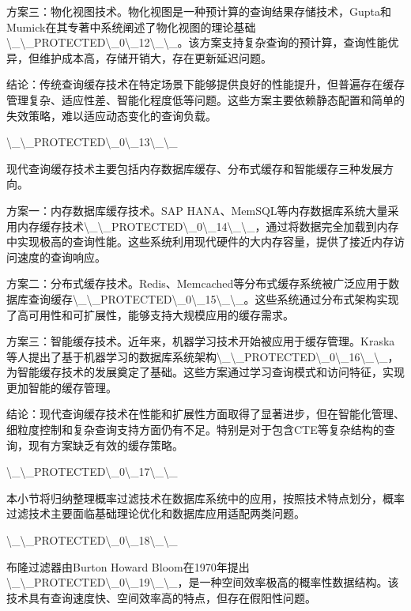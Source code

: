 方案三：物化视图技术。物化视图是一种预计算的查询结果存储技术，Gupta和Mumick在其专著中系统阐述了物化视图的理论基础\textbackslash{}_\textbackslash{}_PROTECTED\textbackslash{}_0\textbackslash{}_12\textbackslash{}_\textbackslash{}_。该方案支持复杂查询的预计算，查询性能优异，但维护成本高，存储开销大，存在更新延迟问题。

结论：传统查询缓存技术在特定场景下能够提供良好的性能提升，但普遍存在缓存管理复杂、适应性差、智能化程度低等问题。这些方案主要依赖静态配置和简单的失效策略，难以适应动态变化的查询负载。

\textbackslash{}_\textbackslash{}_PROTECTED\textbackslash{}_0\textbackslash{}_13\textbackslash{}_\textbackslash{}_

现代查询缓存技术主要包括内存数据库缓存、分布式缓存和智能缓存三种发展方向。

方案一：内存数据库缓存技术。SAP HANA、MemSQL等内存数据库系统大量采用内存缓存技术\textbackslash{}_\textbackslash{}_PROTECTED\textbackslash{}_0\textbackslash{}_14\textbackslash{}_\textbackslash{}_，通过将数据完全加载到内存中实现极高的查询性能。这些系统利用现代硬件的大内存容量，提供了接近内存访问速度的查询响应。

方案二：分布式缓存技术。Redis、Memcached等分布式缓存系统被广泛应用于数据库查询缓存\textbackslash{}_\textbackslash{}_PROTECTED\textbackslash{}_0\textbackslash{}_15\textbackslash{}_\textbackslash{}_。这些系统通过分布式架构实现了高可用性和可扩展性，能够支持大规模应用的缓存需求。

方案三：智能缓存技术。近年来，机器学习技术开始被应用于缓存管理。Kraska等人提出了基于机器学习的数据库系统架构\textbackslash{}_\textbackslash{}_PROTECTED\textbackslash{}_0\textbackslash{}_16\textbackslash{}_\textbackslash{}_，为智能缓存技术的发展奠定了基础。这些方案通过学习查询模式和访问特征，实现更加智能的缓存管理。

结论：现代查询缓存技术在性能和扩展性方面取得了显著进步，但在智能化管理、细粒度控制和复杂查询支持方面仍有不足。特别是对于包含CTE等复杂结构的查询，现有方案缺乏有效的缓存策略。

\textbackslash{}_\textbackslash{}_PROTECTED\textbackslash{}_0\textbackslash{}_17\textbackslash{}_\textbackslash{}_

本小节将归纳整理概率过滤技术在数据库系统中的应用，按照技术特点划分，概率过滤技术主要面临基础理论优化和数据库应用适配两类问题。

\textbackslash{}_\textbackslash{}_PROTECTED\textbackslash{}_0\textbackslash{}_18\textbackslash{}_\textbackslash{}_

布隆过滤器由Burton Howard Bloom在1970年提出\textbackslash{}_\textbackslash{}_PROTECTED\textbackslash{}_0\textbackslash{}_19\textbackslash{}_\textbackslash{}_，是一种空间效率极高的概率性数据结构。该技术具有查询速度快、空间效率高的特点，但存在假阳性问题。

